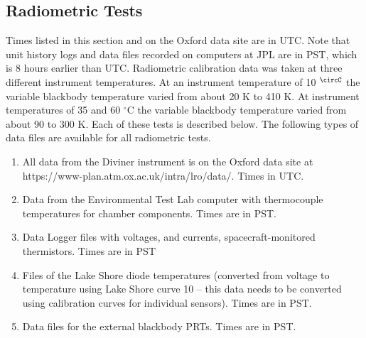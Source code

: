 \subsection{Radiometric Tests}
Times listed in this section and on the Oxford data site are in UTC.
Note that unit history logs and data files recorded on computers at JPL are in PST, which is 8 hours earlier than UTC.
Radiometric calibration data was taken at three different instrument temperatures.
At an instrument temperature of 10 $^\circC$ the variable blackbody temperature varied from about 20 K to 410 K.
At instrument temperatures of 35 and 60 $^\circ$C the variable blackbody temperature varied from about 90 to 300 K.
Each of these tests is described below.
The following types of data files are available for all radiometric tests.

\begin{enumerate}
\item All data from the Diviner instrument is on the Oxford data site at https://www-plan.atm.ox.ac.uk/intra/lro/data/. Times in UTC.
\item Data from the Environmental Test Lab computer with thermocouple temperatures for chamber components. Times are in PST.
\item Data Logger files with voltages, and currents, spacecraft-monitored thermistors. Times are in PST
\item Files of the Lake Shore diode temperatures (converted from voltage to temperature using Lake Shore curve 10 – this data needs to be converted using calibration curves for individual sensors). Times are in PST.
\item Data files for the external blackbody PRTs. Times are in PST.
\end{enumerate}


